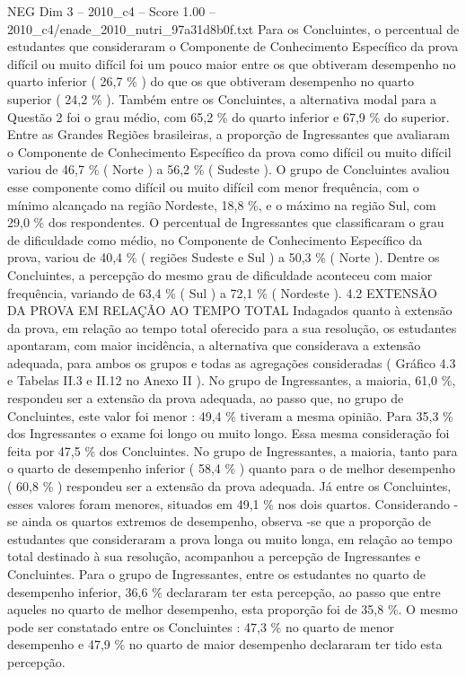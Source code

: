 \begin{textsample}{NEG Dim 3 – 2010\_c4 – Score 1.00 – 2010\_c4/enade\_2010\_nutri\_97a31d8b0f.txt}
Para os Concluintes, o percentual de estudantes que consideraram o Componente de Conhecimento Específico da prova difícil ou muito difícil foi um pouco maior entre os que obtiveram desempenho no quarto inferior ( 26,7 \% ) do que os que obtiveram desempenho no quarto superior ( 24,2 \% ).
Também entre os Concluintes, a alternativa modal para a Questão 2 foi o grau médio, com 65,2 \% do quarto inferior e 67,9 \% do superior.
Entre as Grandes Regiões brasileiras, a proporção de Ingressantes que avaliaram o Componente de Conhecimento Específico da prova como difícil ou muito difícil variou de 46,7 \% ( Norte ) a 56,2 \% ( Sudeste ).
O grupo de Concluintes avaliou esse componente como difícil ou muito difícil com menor frequência, com o mínimo alcançado na região Nordeste, 18,8 \%, e o máximo na região Sul, com 29,0 \% dos respondentes.
O percentual de Ingressantes que classificaram o grau de dificuldade como médio, no Componente de Conhecimento Específico da prova, variou de 40,4 \% ( regiões Sudeste e Sul ) a 50,3 \% ( Norte ).
Dentre os Concluintes, a percepção do mesmo grau de dificuldade aconteceu com maior frequência, variando de 63,4 \% ( Sul ) a 72,1 \% ( Nordeste ). 4.2 EXTENSÃO DA PROVA EM RELAÇÃO AO TEMPO TOTAL Indagados quanto à extensão da prova, em relação ao tempo total oferecido para a sua resolução, os estudantes apontaram, com maior incidência, a alternativa que considerava a extensão adequada, para ambos os grupos e todas as agregações consideradas ( Gráfico 4.3 e Tabelas II.3 e II.12 no Anexo II ).
No grupo de Ingressantes, a maioria, 61,0 \%, respondeu ser a extensão da prova adequada, ao passo que, no grupo de Concluintes, este valor foi menor : 49,4 \% tiveram a mesma opinião.
Para 35,3 \% dos Ingressantes o exame foi longo ou muito longo.
Essa mesma consideração foi feita por 47,5 \% dos Concluintes.
No grupo de Ingressantes, a maioria, tanto para o quarto de desempenho inferior ( 58,4 \% ) quanto para o de melhor desempenho ( 60,8 \% ) respondeu ser a extensão da prova adequada.
Já entre os Concluintes, esses valores foram menores, situados em 49,1 \% nos dois quartos.
Considerando -se ainda os quartos extremos de desempenho, observa -se que a proporção de estudantes que consideraram a prova longa ou muito longa, em relação ao tempo total destinado à sua resolução, acompanhou a percepção de Ingressantes e Concluintes.
Para o grupo de Ingressantes, entre os estudantes no quarto de desempenho inferior, 36,6 \% declararam ter esta percepção, ao passo que entre aqueles no quarto de melhor desempenho, esta proporção foi de 35,8 \%.
O mesmo pode ser constatado entre os Concluintes : 47,3 \% no quarto de menor desempenho e 47,9 \% no quarto de maior desempenho declararam ter tido esta percepção.

\end{textsample}
